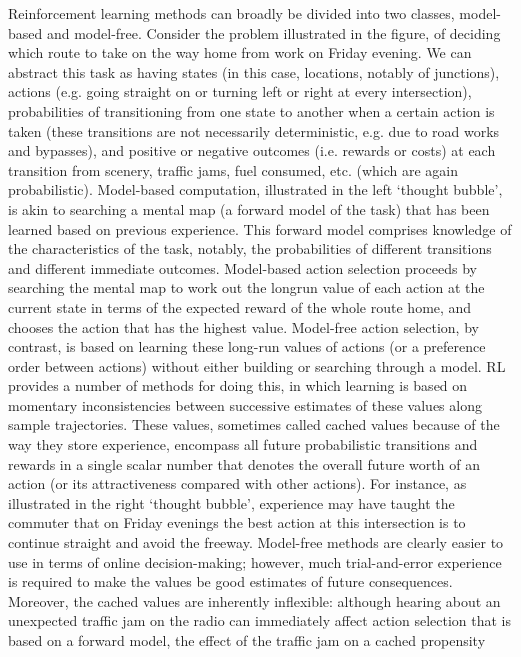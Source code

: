 

Reinforcement learning methods can broadly be divided into two classes, model-based and model-free. Consider the problem illustrated in the
figure, of deciding which route to take on the way home from work on Friday evening. We can abstract this task as having states (in this case,
locations, notably of junctions), actions (e.g. going straight on or turning left or right at every intersection), probabilities of transitioning from one
state to another when a certain action is taken (these transitions are not necessarily deterministic, e.g. due to road works and bypasses), and
positive or negative outcomes (i.e. rewards or costs) at each transition from scenery, traffic jams, fuel consumed, etc. (which are again
probabilistic).
Model-based computation, illustrated in the left ‘thought bubble’, is akin to searching a mental map (a forward model of the task) that has been
learned based on previous experience. This forward model comprises knowledge of the characteristics of the task, notably, the probabilities of
different transitions and different immediate outcomes. Model-based action selection proceeds by searching the mental map to work out the longrun
value of each action at the current state in terms of the expected reward of the whole route home, and chooses the action that has the highest
value.
Model-free action selection, by contrast, is based on learning these long-run values of actions (or a preference order between actions) without
either building or searching through a model. RL provides a number of methods for doing this, in which learning is based on momentary
inconsistencies between successive estimates of these values along sample trajectories. These values, sometimes called cached values because
of the way they store experience, encompass all future probabilistic transitions and rewards in a single scalar number that denotes the overall future
worth of an action (or its attractiveness compared with other actions). For instance, as illustrated in the right ‘thought bubble’, experience may have
taught the commuter that on Friday evenings the best action at this intersection is to continue straight and avoid the freeway.
Model-free methods are clearly easier to use in terms of online decision-making; however, much trial-and-error experience is required to make the
values be good estimates of future consequences. Moreover, the cached values are inherently inflexible: although hearing about an unexpected
traffic jam on the radio can immediately affect action selection that is based on a forward model, the effect of the traffic jam on a cached propensity
